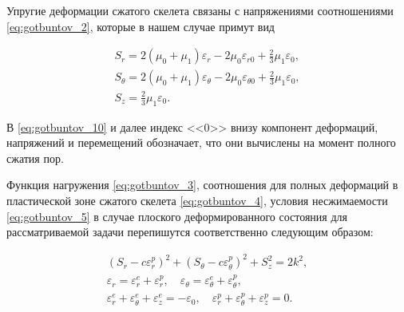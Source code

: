 Упругие деформации сжатого скелета связаны с напряжениями соотношениями \eqref{eq:gotbuntov_2}, которые в нашем случае примут вид

\begin{equation} \label{eq:gotbuntov_10} 

\begin{array}{l}

\displaystyle

S_{r} =2(\mu_{0} +\mu_{1} )\varepsilon_{r} -2\mu_{0} \varepsilon_{r0} +\frac{2}{3} \mu _{1} \varepsilon _{0},\\[3mm]

\displaystyle S_{\theta } =2(\mu _{0} +\mu _{1} )\varepsilon _{\theta } -2\mu _{0} \varepsilon _{\theta 0} +\frac{2}{3} \mu _{1} \varepsilon _{0}, \\[3mm] 

\displaystyle

S_{z} =\frac{2}{3} \mu _{1} \varepsilon _{0}.

\end{array}

\end{equation} 



В \eqref{eq:gotbuntov_10} и далее индекс <<$0$>> внизу компонент деформаций, напряжений и перемещений обозначает, что они вычислены на момент полного сжатия пор.



Функция нагружения \eqref{eq:gotbuntov_3}, соотношения для полных деформаций в пластической зоне сжатого скелета \eqref{eq:gotbuntov_4}, условия несжимаемости \eqref{eq:gotbuntov_5} в случае плоского деформированного состояния для рассматриваемой задачи перепишутся соответственно следующим образом:

\begin{gather} 

\label{eq:gotbuntov_14}

(S_r-c\varepsilon_r^p)^2+(S_{\theta}-c\varepsilon_{\theta}^p)^2+S_z^2=2k^2, 

\\

\label{eq:gotbuntov_14}

\varepsilon_r=\varepsilon_r^e+\varepsilon_r^p,\quad  \varepsilon_{\theta}=\varepsilon_{\theta}^e+\varepsilon_{\theta}^p,  

\\

\label{eq:gotbuntov_14}

\varepsilon_r^e+\varepsilon_{\theta}^e+\varepsilon_z^e=-\varepsilon_0,\quad  \varepsilon_r^p+\varepsilon_{\theta}^p+\varepsilon_z^p=0. 

\end{gather} 



